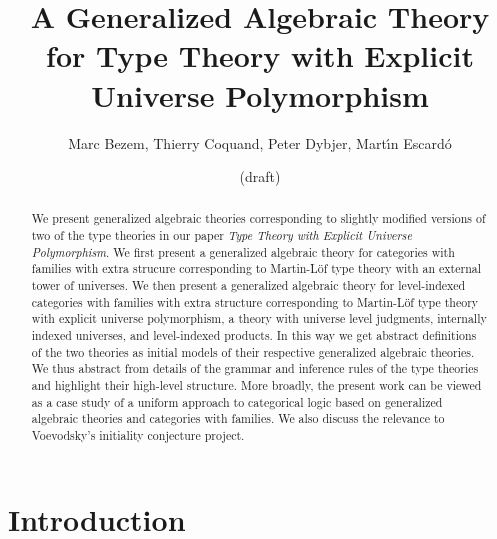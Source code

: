 \documentclass[11pt,a4paper]{article}
\theoremstyle{plain}
\theoremstyle{definition}
\begin{document}
\title{A Generalized Algebraic Theory\\ for Type Theory
with Explicit Universe Polymorphism
}

\author{Marc Bezem, Thierry Coquand, Peter Dybjer, Mart\'{\i}n Escard\'o}

\date{(draft)}
\maketitle

\begin{abstract}
We present generalized algebraic theories corresponding to slightly modified versions of two of the type theories in our paper
{\em Type Theory with Explicit Universe Polymorphism}. We first present a generalized algebraic theory for categories with families with extra strucure corresponding to Martin-Löf type theory with an external tower of universes. We then present a generalized algebraic theory for level-indexed categories with families with extra structure corresponding to Martin-Löf type theory with explicit universe polymorphism, a theory with universe level judgments, internally indexed universes, and level-indexed products. In this way we get abstract definitions of the two theories as initial models of their respective generalized algebraic theories. We thus abstract from details of the grammar and inference rules of the type theories and highlight their high-level structure. More broadly, the present work can be viewed as a case study of a uniform approach to categorical logic based on generalized algebraic theories and categories with families. We also discuss the relevance to Voevodsky's initiality conjecture project. 
\end{abstract}

\section{Introduction}
\end{document}

